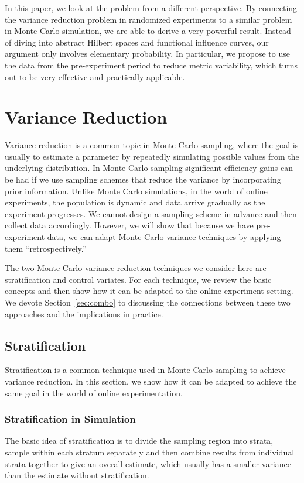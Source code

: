 \documentclass{sig-alternate}
\begin{document}
In this paper, we look at the problem from a different perspective. By connecting the variance reduction problem in randomized experiments to a similar problem in Monte Carlo simulation, we are able to derive a very powerful result.
Instead of diving into abstract Hilbert spaces and functional influence curves, our argument only involves elementary probability. In particular, we propose to use the data from the pre-experiment period to reduce metric variability, which turns out to be very effective and practically applicable.    


\section{Variance Reduction}\label{sec:varreduction}
Variance reduction is a common topic in Monte Carlo sampling, where the goal is usually to estimate a parameter by repeatedly simulating possible values from the underlying distribution.
In Monte Carlo sampling significant efficiency gains can be had if we use sampling schemes that reduce the variance by incorporating prior information. Unlike Monte Carlo simulations, in the world of online experiments, the population is dynamic and data arrive gradually as the experiment progresses. We cannot design a sampling scheme in advance and then  collect data accordingly. However, we will show that because we have pre-experiment data, we can adapt Monte Carlo variance techniques by applying them ``retrospectively.''

The two Monte Carlo variance reduction techniques we consider here are stratification and control variates. For each technique, we  review the basic concepts and then show how it can be adapted to the online experiment setting.  We devote Section~\ref{sec:combo} to discussing the connections between these two approaches and the implications in practice.

\subsection{Stratification}
Stratification is a common technique used in Monte Carlo sampling to achieve variance reduction. In this section, we show how it can be adapted to achieve the same goal in the world of online experimentation. 


\subsubsection{Stratification in Simulation}\label{sec:stratSim}
The basic idea of stratification is to divide the sampling region into strata, sample within each stratum separately and then combine results from individual strata together to give an overall estimate, which usually has a smaller variance than the  estimate without stratification.
\end{document}
